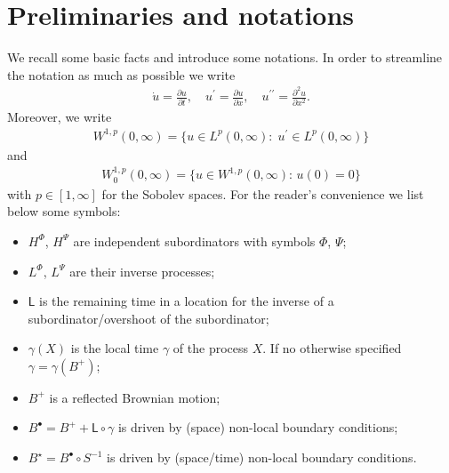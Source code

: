 \documentclass[11pt,a4paper]{article}
\theoremstyle{plain}
\theoremstyle{definition}
\theoremstyle{remark}
\begin{document}
	\section{Preliminaries and notations} 
	\label{sec:PrelNot}		
	We recall some basic facts and introduce some notations. In order to streamline the notation as much as possible we write
	\begin{align*}
		\dot{u} = \frac{\partial u}{\partial t}, \quad u^\prime = \frac{\partial u}{\partial x}, \quad u^{\prime \prime} = \frac{\partial^2 u}{\partial x^2}.
	\end{align*}
	Moreover, we write
	\begin{align*}
		W^{1,p}(0, \infty) = \{ u \in L^p(0, \infty):\;  u^\prime \in L^p(0, \infty) \}
	\end{align*}
	and
	\begin{align*}
		W^{1,p}_0 (0, \infty) = \{ u \in W^{1,p}(0, \infty):\, u(0)=0\}
	\end{align*}
	with $p \in [1,\infty]$ for the Sobolev spaces. For the reader's convenience we list below some symbols:
	\begin{itemize}
		\item[-] $H^\Phi$, $H^\Psi$ are independent subordinators with symbols $\Phi$, $\Psi$;
		\item[-] $L^\Phi$, $L^\Psi$ are their inverse processes;
		\item[-] $\mathsf{L}$ is the remaining time in a location for the inverse of a subordinator/overshoot of the subordinator;
		\item[-] $\gamma(X)$ is the local time $\gamma$ of the process $X$. If no otherwise specified $\gamma=\gamma(B^+)$;
		\item[-] $B^+$ is a reflected Brownian motion;
		\item[-] $B^\bullet = B^+ + \mathsf{L} \circ \gamma$ is driven by (space) non-local boundary conditions;
		\item[-] $B^\star = B^\bullet \circ S^{-1}$ is driven by (space/time) non-local boundary conditions.
	\end{itemize}
	
	
\end{document}
